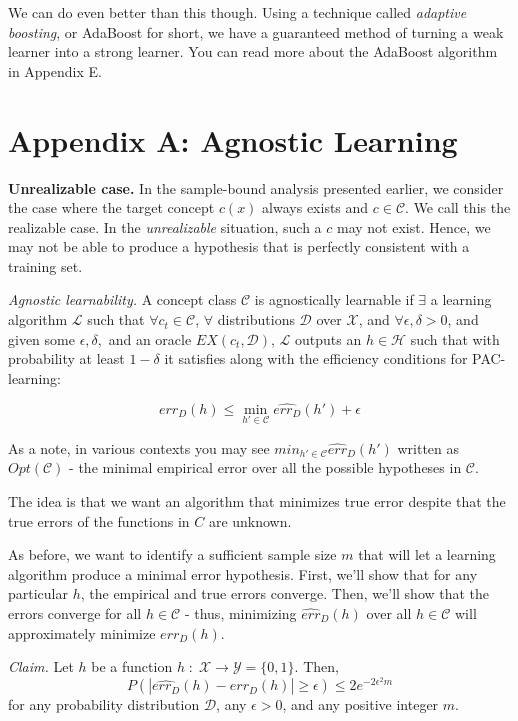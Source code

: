 \documentclass{article}
\begin{document}
We can do even better than this though. Using a technique called \emph{adaptive
boosting}, or AdaBoost for short, we have a guaranteed method of turning a weak
learner into a strong learner. You can read more about the AdaBoost algorithm
in Appendix E.

\appendix
\section{Appendix A: Agnostic Learning}
\textbf{Unrealizable case.} In the sample-bound analysis presented
earlier, we consider the case
where the target concept $c(x)$ always exists and $c \in \mathcal{C}$.
We call this the realizable case. In the \emph{unrealizable} situation,
such a $c$ may not exist. Hence, we may not be able to produce a
hypothesis that is perfectly consistent with a training set.

\emph{Agnostic learnability.} A concept class $\mathcal{C}$ is
agnostically learnable if $\exists$ a learning algorithm $\mathcal{L}$
such that $\forall c_t \in \mathcal{C}$, $\forall$ distributions
$\mathcal{D}$ over $\mathcal{X}$, and $\forall \epsilon, \delta > 0$,
and given some $\epsilon, \delta,$ and an oracle $EX(c_t, \mathcal{D})$,
$\mathcal{L}$ outputs an $h \in \mathcal{H}$ such that with probability
at least $1 - \delta$ it satisfies along with the efficiency conditions
for PAC-learning:

$$err_D(h) \leq \min_{h'\in \mathcal{C}} \hat{err_D}(h') + \epsilon$$

As a note, in various contexts you may see $min_{h' \in \mathcal{C}}
\hat{err}_D(h')$ written as $Opt(\mathcal{C})$ - the minimal empirical
error over all the possible hypotheses in $\mathcal{C}$.

The idea is that we want an algorithm that minimizes true error despite
that the true errors of the functions in $C$ are unknown.

As before, we want to identify a sufficient sample size $m$ that will
let a learning algorithm produce a minimal error hypothesis. First,
we'll show that for any particular $h$, the empirical and true errors
converge. Then, we'll show that the errors converge for all $h \in
\mathcal{C}$ - thus, minimizing $\hat{err}_D(h)$ over all $h \in
\mathcal{C}$ will approximately minimize $err_D(h)$.

\emph{Claim.} Let $h$ be a function $h\;:\;\mathcal{X}\rightarrow
\mathcal{Y} = \{0,1\}$. Then, $$P(|\hat{err_D}(h) - err_D(h)| \geq
\epsilon) \leq 2e^{-2\epsilon^2 m}$$ for any probability distribution
$\mathcal{D}$, any $\epsilon >0$, and any positive integer $m$.
\end{document}
